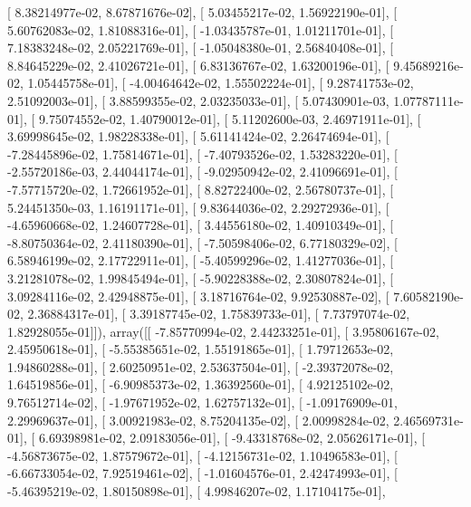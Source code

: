\documentclass{article}
\begin{document}
       [  8.38214977e-02,   8.67871676e-02],
       [  5.03455217e-02,   1.56922190e-01],
       [  5.60762083e-02,   1.81088316e-01],
       [ -1.03435787e-01,   1.01211701e-01],
       [  7.18383248e-02,   2.05221769e-01],
       [ -1.05048380e-01,   2.56840408e-01],
       [  8.84645229e-02,   2.41026721e-01],
       [  6.83136767e-02,   1.63200196e-01],
       [  9.45689216e-02,   1.05445758e-01],
       [ -4.00464642e-02,   1.55502224e-01],
       [  9.28741753e-02,   2.51092003e-01],
       [  3.88599355e-02,   2.03235033e-01],
       [  5.07430901e-03,   1.07787111e-01],
       [  9.75074552e-02,   1.40790012e-01],
       [  5.11202600e-03,   2.46971911e-01],
       [  3.69998645e-02,   1.98228338e-01],
       [  5.61141424e-02,   2.26474694e-01],
       [ -7.28445896e-02,   1.75814671e-01],
       [ -7.40793526e-02,   1.53283220e-01],
       [ -2.55720186e-03,   2.44044174e-01],
       [ -9.02950942e-02,   2.41096691e-01],
       [ -7.57715720e-02,   1.72661952e-01],
       [  8.82722400e-02,   2.56780737e-01],
       [  5.24451350e-03,   1.16191171e-01],
       [  9.83644036e-02,   2.29272936e-01],
       [ -4.65960668e-02,   1.24607728e-01],
       [  3.44556180e-02,   1.40910349e-01],
       [ -8.80750364e-02,   2.41180390e-01],
       [ -7.50598406e-02,   6.77180329e-02],
       [  6.58946199e-02,   2.17722911e-01],
       [ -5.40599296e-02,   1.41277036e-01],
       [  3.21281078e-02,   1.99845494e-01],
       [ -5.90228388e-02,   2.30807824e-01],
       [  3.09284116e-02,   2.42948875e-01],
       [  3.18716764e-02,   9.92530887e-02],
       [  7.60582190e-02,   2.36884317e-01],
       [  3.39187745e-02,   1.75839733e-01],
       [  7.73797074e-02,   1.82928055e-01]]), array([[ -7.85770994e-02,   2.44233251e-01],
       [  3.95806167e-02,   2.45950618e-01],
       [ -5.55385651e-02,   1.55191865e-01],
       [  1.79712653e-02,   1.94860288e-01],
       [  2.60250951e-02,   2.53637504e-01],
       [ -2.39372078e-02,   1.64519856e-01],
       [ -6.90985373e-02,   1.36392560e-01],
       [  4.92125102e-02,   9.76512714e-02],
       [ -1.97671952e-02,   1.62757132e-01],
       [ -1.09176909e-01,   2.29969637e-01],
       [  3.00921983e-02,   8.75204135e-02],
       [  2.00998284e-02,   2.46569731e-01],
       [  6.69398981e-02,   2.09183056e-01],
       [ -9.43318768e-02,   2.05626171e-01],
       [ -4.56873675e-02,   1.87579672e-01],
       [ -4.12156731e-02,   1.10496583e-01],
       [ -6.66733054e-02,   7.92519461e-02],
       [ -1.01604576e-01,   2.42474993e-01],
       [ -5.46395219e-02,   1.80150898e-01],
       [  4.99846207e-02,   1.17104175e-01],
\end{document}
